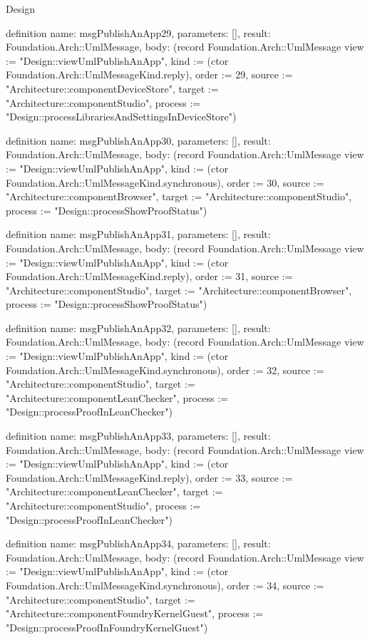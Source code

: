 \begin{lexlean}{Design}
\begin{semanticmodule}
definition{
  name: msgPublishAnApp29,
  parameters: [],
  result: Foundation.Arch::UmlMessage,
  body: (record Foundation.Arch::UmlMessage {view := "Design::viewUmlPublishAnApp", kind := (ctor Foundation.Arch::UmlMessageKind.reply), order := 29, source := "Architecture::componentDeviceStore", target := "Architecture::componentStudio", process := "Design::processLibrariesAndSettingsInDeviceStore"})
}

definition{
  name: msgPublishAnApp30,
  parameters: [],
  result: Foundation.Arch::UmlMessage,
  body: (record Foundation.Arch::UmlMessage {view := "Design::viewUmlPublishAnApp", kind := (ctor Foundation.Arch::UmlMessageKind.synchronous), order := 30, source := "Architecture::componentBrowser", target := "Architecture::componentStudio", process := "Design::processShowProofStatus"})
}

definition{
  name: msgPublishAnApp31,
  parameters: [],
  result: Foundation.Arch::UmlMessage,
  body: (record Foundation.Arch::UmlMessage {view := "Design::viewUmlPublishAnApp", kind := (ctor Foundation.Arch::UmlMessageKind.reply), order := 31, source := "Architecture::componentStudio", target := "Architecture::componentBrowser", process := "Design::processShowProofStatus"})
}

definition{
  name: msgPublishAnApp32,
  parameters: [],
  result: Foundation.Arch::UmlMessage,
  body: (record Foundation.Arch::UmlMessage {view := "Design::viewUmlPublishAnApp", kind := (ctor Foundation.Arch::UmlMessageKind.synchronous), order := 32, source := "Architecture::componentStudio", target := "Architecture::componentLeanChecker", process := "Design::processProofInLeanChecker"})
}

definition{
  name: msgPublishAnApp33,
  parameters: [],
  result: Foundation.Arch::UmlMessage,
  body: (record Foundation.Arch::UmlMessage {view := "Design::viewUmlPublishAnApp", kind := (ctor Foundation.Arch::UmlMessageKind.reply), order := 33, source := "Architecture::componentLeanChecker", target := "Architecture::componentStudio", process := "Design::processProofInLeanChecker"})
}

definition{
  name: msgPublishAnApp34,
  parameters: [],
  result: Foundation.Arch::UmlMessage,
  body: (record Foundation.Arch::UmlMessage {view := "Design::viewUmlPublishAnApp", kind := (ctor Foundation.Arch::UmlMessageKind.synchronous), order := 34, source := "Architecture::componentStudio", target := "Architecture::componentFoundryKernelGuest", process := "Design::processProofInFoundryKernelGuest"})
}


\end{semanticmodule}
\end{lexlean}
